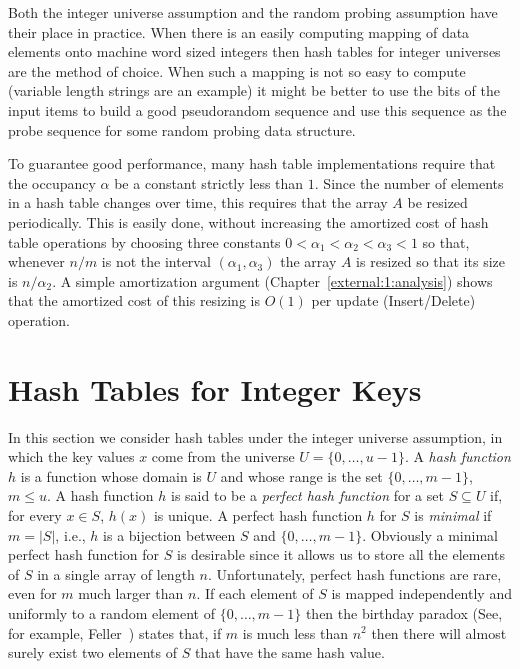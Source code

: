Both the integer universe assumption and the random probing
assumption have their place in practice.  When there is an easily
computing mapping of data elements onto machine word sized integers
then hash tables for integer universes are the method of choice.  When
such a mapping is not so easy to compute (variable length strings are
an example) it might be better to use the bits of the input items to
build a good pseudorandom sequence and use this sequence as the probe
sequence for some random probing data structure. 

To guarantee good performance, many hash table implementations require
that the occupancy $\alpha$ be a constant strictly less than $1$.
Since the number of elements in a hash table changes over time, this
requires that the array $A$ be resized periodically.  This is easily
done, without increasing the amortized cost of hash table operations
by choosing three constants $0< \alpha_1 < \alpha_2 < \alpha_3 < 1$ so
that, whenever $n/m$ is not the interval $(\alpha_1,\alpha_3)$ the
array $A$ is resized so that its size is $n/\alpha_2$. A simple
amortization argument (Chapter~\ref{external:1:analysis}) shows that
the amortized cost of this resizing is $O(1)$ per update
(Insert/Delete) operation.


\section{Hash Tables for Integer Keys}
\label{hash:sec:integers}

In this section we consider hash tables under the integer universe
assumption, in which the key values $x$ come from the universe
$U=\{0,\ldots,u-1\}$.   A \emph{hash function}
$h$ is a function whose domain is $U$ and whose range is the set
$\{0,\ldots,m-1\}$, $m\le u$.  A hash function $h$ is said to be a
\emph{perfect hash function} for a set $S\subseteq
U$ if, for every $x\in S$, $h(x)$ is unique.  A perfect hash function
$h$ for $S$ is \emph{minimal} if $m=|S|$, i.e., $h$ is
a bijection between $S$ and $\{0,\ldots,m-1\}$.  Obviously a minimal
perfect hash function for $S$ is desirable since it allows us to store
all the elements of $S$ in a single array of length $n$.
Unfortunately, perfect hash functions are rare, even for $m$ much
larger than $n$.  If each element of $S$ is mapped independently and
uniformly to a random element of $\{0,\ldots,m-1\}$ then the birthday
paradox (See, for example, Feller~\cite{f68}) states that, if $m$ is
much less than $n^2$ then there will almost surely exist two elements
of $S$ that have the same hash value.

